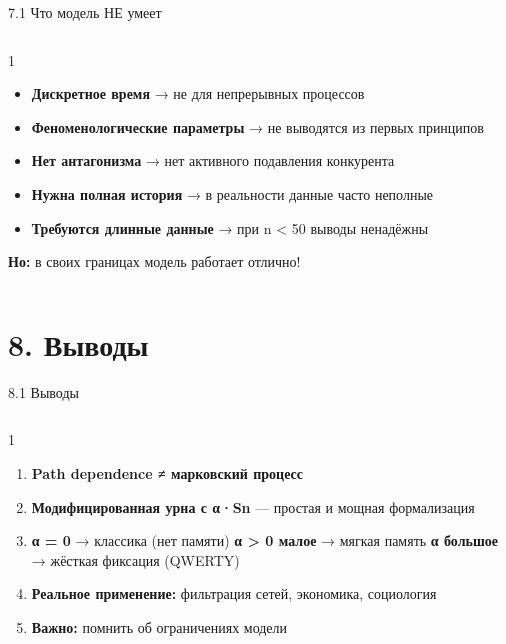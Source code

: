 \documentclass[
  ignorenonframetext,
  aspectratio=169,
  russian,
]{beamer}
\providecommand{\tightlist}{%
  \setlength{\itemsep}{0pt}\setlength{\parskip}{0pt}}
\begin{document}
\begin{frame}{7.1 Что модель НЕ умеет}
\label{ux447ux442ux43e-ux43cux43eux434ux435ux43bux44c-ux43dux435-ux443ux43cux435ux435ux442}
\begin{columns}[T]
\begin{column}{1\linewidth}
\begin{itemize}
\tightlist
\item
  \textbf{Дискретное время} → не для непрерывных процессов
\item
  \textbf{Феноменологические параметры} → не выводятся из первых
  принципов
\item
  \textbf{Нет антагонизма} → нет активного подавления конкурента
\item
  \textbf{Нужна полная история} → в реальности данные часто неполные
\item
  \textbf{Требуются длинные данные} → при n \textless{} 50 выводы
  ненадёжны
\end{itemize}

\textbf{Но:} в своих границах модель работает отлично!
\end{column}
\end{columns}
\end{frame}

\section{8. Выводы}\label{ux432ux44bux432ux43eux434ux44b}

\begin{frame}{8.1 Выводы}
\label{ux432ux44bux432ux43eux434ux44b-1}
\begin{columns}[T]
\begin{column}{1\linewidth}
\begin{enumerate}
\item
  \textbf{Path dependence ≠ марковский процесс}
\item
  \textbf{Модифицированная урна с α·Sn} --- простая и мощная
  формализация
\item
  \textbf{α = 0} → классика (нет памяти) \textbf{α \textgreater{} 0
  малое} → мягкая память \textbf{α большое} → жёсткая фиксация (QWERTY)
\item
  \textbf{Реальное применение:} фильтрация сетей, экономика, социология
\item
  \textbf{Важно:} помнить об ограничениях модели
\end{enumerate}
\end{column}
\end{columns}
\end{frame}
\end{document}
